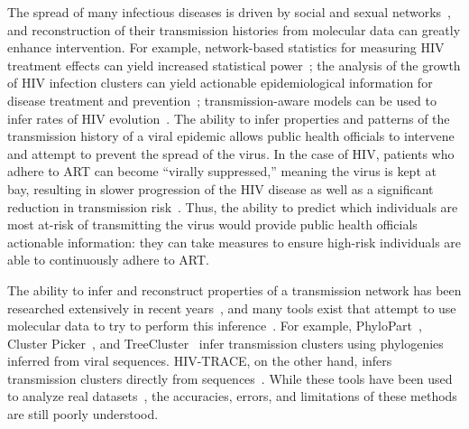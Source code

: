 The spread of many infectious diseases is driven by social and sexual networks~\cite{Rivas2012}, and reconstruction of their transmission histories from molecular data can greatly enhance intervention. For example, network-based statistics for measuring \gls{HIV} treatment effects can yield increased statistical power~\cite{Wertheim2011}; the analysis of the growth of \gls{HIV} infection clusters can yield actionable epidemiological information for disease treatment and prevention~\cite{Aldous2012,Brenner2013}; transmission-aware models can be used to infer rates of \gls{HIV} evolution~\cite{Vrancken2014}. The ability to infer properties and patterns of the transmission history of a viral epidemic allows public health officials to intervene and attempt to prevent the spread of the virus. In the case of \gls{HIV}, patients who adhere to \gls{ART} can become ``virally suppressed,'' meaning the virus is kept at bay, resulting in slower progression of the \gls{HIV} disease as well as a significant reduction in transmission risk~\cite{AIDSinfo2019}. Thus, the ability to predict which individuals are most at-risk of transmitting the virus would provide public health officials actionable information: they can take measures to ensure high-risk individuals are able to continuously adhere to \gls{ART}.

The ability to infer and reconstruct properties of a transmission network has been researched extensively in recent years~\cite{Wertheim2017,Ragonnet-Cronin2019}, and many tools exist that attempt to use molecular data to try to perform this inference~\cite{Rose2017}. For example, PhyloPart~\cite{Prosperi2011}, Cluster Picker~\cite{Ragonnet-Cronin2013}, and TreeCluster~\cite{Balaban2019} infer transmission clusters using phylogenies inferred from viral sequences. HIV-TRACE, on the other hand, infers transmission clusters directly from sequences~\cite{Pond2018}. While these tools have been used to analyze real datasets~\cite{Campbell2017}, the accuracies, errors, and limitations of these methods are still poorly understood.

